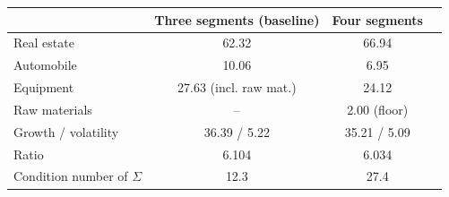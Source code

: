 \begin{tabular}{lccc}
\toprule
& \textbf{Three segments (baseline)} & \textbf{Four segments} &  \\
\midrule
Real estate & 62.32 & 66.94 &  \\
Automobile & 10.06 & 6.95 &  \\
Equipment & 27.63 (incl. raw mat.) & 24.12 &  \\
Raw materials & -- & 2.00 (floor) &  \\
Growth / volatility & 36.39 / 5.22 & 35.21 / 5.09 &  \\
Ratio & 6.104 & 6.034 &  \\
Condition number of $\Sigma$ & 12.3 & 27.4 &  \\
\bottomrule
\end{tabular}
